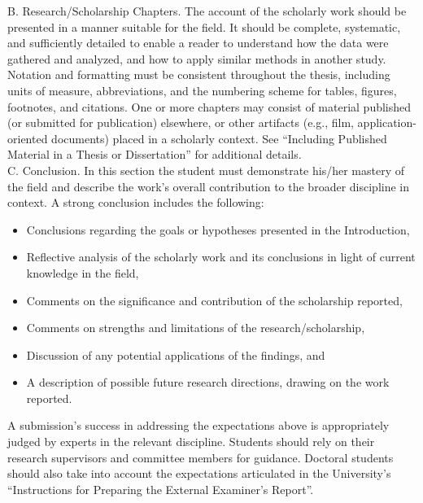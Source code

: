   B. Research/Scholarship Chapters. The account of the scholarly work should be presented in a 
    manner suitable for the field. It should be complete, systematic, and sufficiently detailed to 
    enable a reader to understand how the data were gathered and analyzed, and how to apply similar 
    methods in another study. Notation and formatting must be consistent throughout the thesis, 
    including units of measure, abbreviations, and the numbering scheme for tables, figures, 
    footnotes, and citations. One or more chapters may consist of material published (or submitted
    for publication) elsewhere, or other artifacts (e.g., film, application-oriented documents) 
    placed in a scholarly context. See “Including Published Material in a Thesis or Dissertation” 
    for additional details. \\

  C. Conclusion. In this section the student must demonstrate his/her mastery of the field and 
    describe the work's overall contribution to the broader discipline in context. A strong 
    conclusion includes the following:
    \begin{itemize}
      \item Conclusions regarding the goals or hypotheses presented in the Introduction,
      \item Reflective analysis of the scholarly work and its conclusions in light of current 
        knowledge in the field,
      \item Comments on the significance and contribution of the scholarship reported,
      \item Comments on strengths and limitations of the research/scholarship,
      \item Discussion of any potential applications of the findings, and
      \item A description of possible future research directions, drawing on the work reported.
    \end{itemize}
    A submission's success in addressing the expectations above is appropriately judged by experts 
      in the relevant discipline. Students should rely on their research supervisors and committee 
      members for guidance. Doctoral students should also take into account the expectations 
      articulated in the University's “Instructions for Preparing the External Examiner's Report”.

